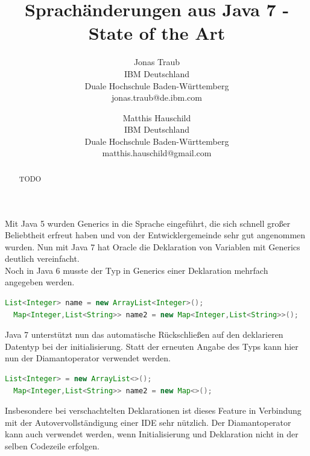 \documentclass[times, 10pt,twocolumn]{article}
\begin{document}
\title{Sprachänderungen aus Java 7 - State of the Art}

\author{Jonas Traub\\
IBM Deutschland\\
Duale Hochschule Baden-Württemberg\\
jonas.traub@de.ibm.com
\and
Matthis Hauschild\\
IBM Deutschland\\
Duale Hochschule Baden-Württemberg\\
matthis.hauschild@gmail.com\\
}

\maketitle
\thispagestyle{empty}

\begin{abstract}
TODO 
\end{abstract}


Mit Java 5 wurden Generics in die Sprache eingeführt, die sich schnell großer Beliebtheit erfreut haben und von der Entwicklergemeinde sehr gut angenommen wurden. Nun mit Java 7 hat Oracle die Deklaration von Variablen mit Generics deutlich vereinfacht\cite{oracleJavaRel}.\\

Noch in Java 6 musste der Typ in Generics einer Deklaration mehrfach angegeben werden.
\begin{lstlisting}[language=java,breaklines=true]
  List<Integer> name = new ArrayList<Integer>();
  Map<Integer,List<String>> name2 = new Map<Integer,List<String>>();
\end{lstlisting}
Java 7 unterstützt nun das automatische Rückschließen auf den deklarieren Datentyp bei der initialisierung.\cite{v2bJava7} Statt der erneuten Angabe des Typs kann hier nun der Diamantoperator verwendet werden.
\begin{lstlisting}[language=java,breaklines=true]
  List<Integer> = new ArrayList<>();
  Map<Integer,List<String>> name2 = new Map<>();
\end{lstlisting}
Insbesondere bei verschachtelten Deklarationen ist dieses Feature in Verbindung mit der Autovervollständigung einer IDE sehr nützlich. Der Diamantoperator kann auch verwendet werden, wenn Initialisierung und Deklaration nicht in der selben Codezeile erfolgen.\cite{v2bJava7}\\
\end{document}
